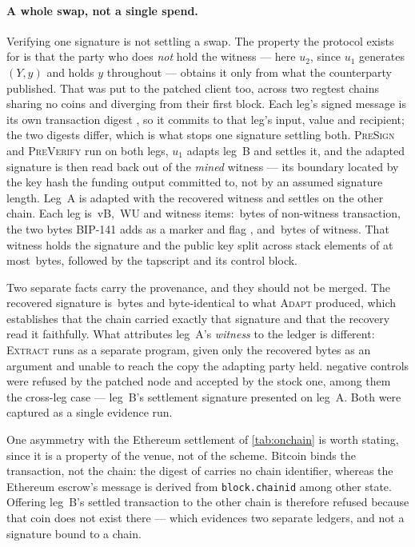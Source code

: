 \paragraph{A whole swap, not a single spend.}
Verifying one signature is not settling a swap. The property the protocol exists for is that
the party who does \emph{not} hold the witness --- here $u_2$, since $u_1$ generates $(Y,y)$
and holds $y$ throughout --- obtains it only from what the counterparty published. That was
put to the patched client too, across two regtest chains sharing no coins and diverging from
their first block. Each leg's signed message is its own transaction digest \cite{bip341}, so
it commits to that leg's input, value and recipient; the two digests differ, which is what
stops one signature settling both. \textsc{PreSign} and \textsc{PreVerify} run on both legs,
$u_1$ adapts leg~B and settles it, and the adapted signature is then read back out of the
\emph{mined} witness --- its boundary located by the key hash the funding output committed to, not by an assumed signature length. Leg~A is adapted with the recovered witness and
settles on the other chain. Each leg is \btcSwapLegVsize\,vB, \btcSwapLegWeight\,WU and
\btcSwapItems{} witness items: \btcSwapLegBase\,bytes of non-witness transaction, the two
bytes BIP-141 adds as a marker and flag \cite{bip141}, and \btcSwapLegWitness\,bytes of
witness. That witness holds the signature and the public key split across stack elements of
at most \btcChunkWidth\,bytes, followed by the tapscript and its control block.

Two separate facts carry the provenance, and they should not be merged. The recovered
signature is \btcSwapRecoveredBytes\,bytes and byte-identical to what \textsc{Adapt}
produced, which establishes that the chain carried exactly that signature and that the
recovery read it faithfully. What attributes leg~A's \emph{witness} to the ledger is
different: \textsc{Extract} runs as a separate program, given only the recovered bytes as an
argument and unable to reach the copy the adapting party held. \btcSwapControls{} negative
controls were refused by the patched node and accepted by the stock one, among them the
cross-leg case --- leg~B's settlement signature presented on leg~A. Both were captured as a single evidence run.

One asymmetry with the Ethereum settlement of \cref{tab:onchain} is worth stating, since it
is a property of the venue, not of the scheme. Bitcoin binds the transaction, not the
chain: the digest of \cite{bip341} carries no chain identifier, whereas the Ethereum escrow's
message is derived from \texttt{block.chainid} among other state. Offering leg~B's settled
transaction to the other chain is therefore refused because that coin does not exist there
--- which evidences two separate ledgers, and not a signature bound to a chain.

